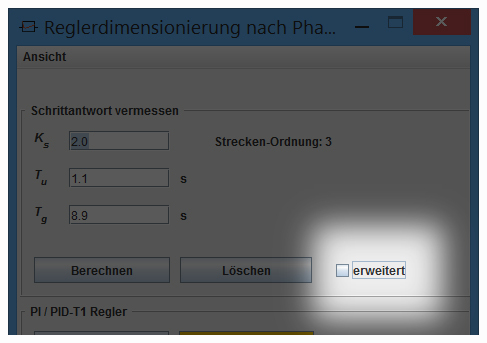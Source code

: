 \begin{minipage}[t][][b]{0.45\textwidth}
    \begin{minipage}[c][][b]{\textwidth}
        \centering
        \includegraphics[width=\textwidth]{images/toolStartPIDSmallErweitert.jpg}
        \label{fig:toolStartPIDSmallErweitert}
    \end{minipage}

\end{minipage}
